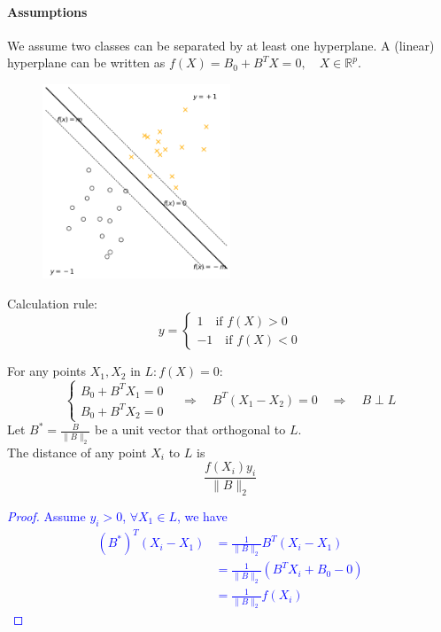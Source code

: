 \documentclass[12pt]{book}
\theoremstyle{definition}
\theoremstyle{remark}
\newcommand{\R}{\mathbb{R}}
\begin{document}
\paragraph{Assumptions}
We assume two classes can be separated by at least one hyperplane. A (linear) hyperplane can be written as $f(X) = B_0 + B^TX = 0,\quad X\in \R^p$. 

\begin{figure}[h]
\centering
\includegraphics[width=0.5\textwidth]{601-8-4-1.png}
\caption{}
\label{601-8-4-1}
\end{figure}

Calculation rule:
\[y = \begin{cases}1 \quad\text{if } f(X) >0
 \\-1 \quad \text{if } f(X) <0
\end{cases}\]


\begin{notionbox}[Notes]
    For any points $X_1, X_2$ in $L: f(X) = 0$:
    \[\begin{cases}
        B_0+B^TX_1= 0\\
        B_0+B^TX_2 = 0
    \end{cases} \quad\Rightarrow\quad B^T(X_1 - X_2) = 0 \quad\Rightarrow\quad B\perp L\]
    Let $B^* = \frac{B}{\|B\|_2}$ be a unit vector that orthogonal to $L$. \\
    The distance of any point $X_i$ to $L$ is 
    \[\frac{f(X_i)y_i}{\|B\|_2}\]

    \textcolor{blue}{
    \begin{proof}
        Assume $y_i>0$, $\forall X_1 \in L$, we have 
        \begin{align*}
            (B^*)^T(X_i - X_1) &= \frac{1}{\|B\|_2}B^T(X_i- X_1)\\
            & = \frac1 {\|B\|_2}(B^TX_i + B_0 - 0)\\
            & = \frac1 {\|B\|_2}f(X_i)
        \end{align*}
    \end{proof}}
\end{notionbox}
\end{document}
